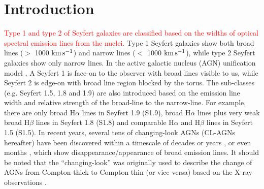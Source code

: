\section{Introduction}\label{sec:intro}

\textcolor{red}{Type 1 and type 2 of Seyfert galaxies are classified based on the widths of optical spectral emission lines from the nuclei.} Type 1 Seyfert galaxies show both broad lines ($>$ 1000 $ \rm{km}\, \rm{s}^{-1}$) and narrow lines ($<$ 1000 $ \rm{km}\, \rm{s}^{-1}$), while type 2 Seyfert galaxies show only narrow lines. In the active galactic nucleus (AGN) unification model \citep[e.g.][]{1993ARA&A..31..473A}, A Seyfert 1  is face-on to the observer with broad lines visible to us, while Seyfert 2 is edge-on with broad line region blocked by the torus. The sub-classes (e.g. Seyfert 1.5, 1.8 and 1.9) are also introduced \citep[see ][]{1976MNRAS.176P..61O,1981ApJ...249..462O} based on the emission line width and relative strength of the broad-line to the narrow-line. For example, there are only broad H$\alpha$ lines in Seyfert 1.9 (S1.9), broad H$\alpha$ lines plus very weak broad H$\beta$ lines in Seyfert 1.8 (S1.8) and comparable H$\alpha$ and H$\beta$ lines in Seyfert 1.5 (S1.5). In recent years, several tens of changing-look AGNs (CL-AGNs hereafter) have been discovered within a timescale of decades or years \citep[e.g.][]{2014ApJ...796..134D,2014ApJ...788...48S,2015ApJ...800..144L,2016A&A...593L...8M,2016MNRAS.461.1927P,2019MNRAS.486..123R,2020ApJ...890L..29A,2020ApJ...901....1W,2020A&A...638A..91K}, or even months \citep[e.g.][]{2018arXiv181103694K,2019ApJ...883...94T}, which show disappearance/appearance of broad emission lines. It should be noted that the ``changing-look'' was originally used to describe the change of AGNs from Compton-thick to Compton-thin (or vice versa) based on the X-ray observations \citep[e.g.][]{2003MNRAS.342..422M}. 

